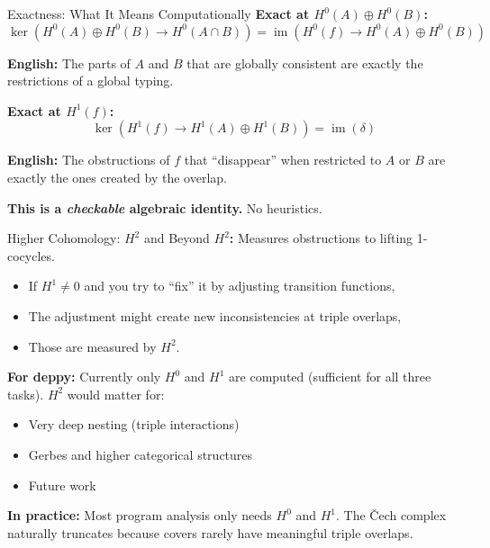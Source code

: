 \documentclass[aspectratio=169,10pt]{beamer}
\newcommand{\im}{\operatorname{im}}
\begin{document}
\begin{frame}{Exactness: What It Means Computationally}
\textbf{Exact at $H^0(A) \oplus H^0(B)$:}
\[
\ker(H^0(A) \oplus H^0(B) \to H^0(A \cap B)) = \im(H^0(f) \to H^0(A) \oplus H^0(B))
\]

\textbf{English:} The parts of $A$ and $B$ that are globally consistent are exactly the restrictions of a global typing.

\vspace{0.3em}
\textbf{Exact at $H^1(f)$:}
\[
\ker(H^1(f) \to H^1(A) \oplus H^1(B)) = \im(\delta)
\]

\textbf{English:} The obstructions of $f$ that ``disappear'' when restricted to $A$ or $B$ are exactly the ones created by the overlap.

\vspace{0.3em}
\textbf{This is a \emph{checkable} algebraic identity.} No heuristics.
\end{frame}

\begin{frame}{Higher Cohomology: $H^2$ and Beyond}
\textbf{$H^2$:} Measures obstructions to lifting 1-cocycles.
\begin{itemize}
  \item If $H^1 \neq 0$ and you try to ``fix'' it by adjusting transition functions,
  \item The adjustment might create new inconsistencies at triple overlaps,
  \item Those are measured by $H^2$.
\end{itemize}

\textbf{For deppy:} Currently only $H^0$ and $H^1$ are computed (sufficient for all three tasks). $H^2$ would matter for:
\begin{itemize}
  \item Very deep nesting (triple interactions)
  \item Gerbes and higher categorical structures
  \item Future work
\end{itemize}

\textbf{In practice:} Most program analysis only needs $H^0$ and $H^1$. The \v{C}ech complex naturally truncates because covers rarely have meaningful triple overlaps.
\end{frame}
\end{document}
